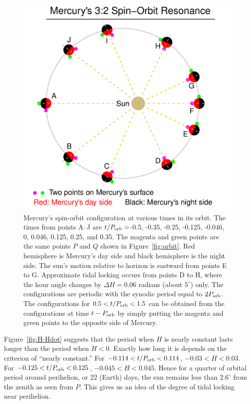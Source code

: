 \documentclass[12pt]{article}
\newcommand{\porb}{P_{\rm orb}}
\begin{document}
\begin{figure}
\includegraphics[width=15cm]{SpinOrbit.pdf}
\caption{Mercury's spin-orbit configuration at various times in its orbit. 
The times from points A--J are $t/\porb =$-0.5, -0.35, -0.25, -0.125, -0.046, 
0, 0.046, 0.125, 0.25, and 0.35. The magenta and green points are the same points 
$P$ and $Q$ shown in Figure~\ref{fig:orbit}. Red hemisphere is Mercury's 
day side and black hemisphere is the night side. 
The sun's motion relative to horizon is eastward from points E to G. Approximate 
tidal locking occurs from points D to H, where the hour angle 
changes by $\Delta H = 0.06$ radians (about $5^\circ$) only. 
The configurations are periodic with the synodic period equal to 
$2\porb$. The configurations for $0.5 < t/\porb < 1.5$ can be 
obtained from the configurations at time $t-\porb$ by simply 
putting the magenta and green points to the opposite side of 
Mercury.}
\label{fig:configs}
\end{figure}

Figure~\ref{fig:H-Hdot} suggests that the period when $H$ is nearly constant 
lasts longer than the period when $\dot{H}<0$. Exactly how long it is 
depends on the criterion of ``nearly constant.'' For $-0.114 < t/\porb < 0.114$, 
$-0.03 < H < 0.03$. For $-0.125 < t/\porb < 0.125$, $-0.045 < H < 0.045$. 
Hence for a quarter of orbital period around perihelion, or 22 (Earth) days, 
the sun remains less than $2.6^\circ$ from the zenith as seen from $P$. 
This gives us an idea of the degree of tidal locking near perihelion.
\end{document}
